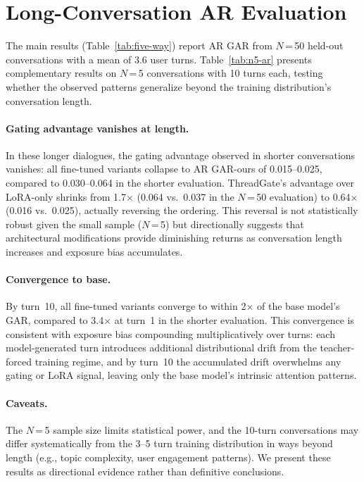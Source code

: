 \section{Long-Conversation AR Evaluation}\label{sec:appendix-n5}

The main results (Table~\ref{tab:five-way}) report AR GAR from $N$\,=\,50 held-out conversations with a mean of 3.6 user turns. Table~\ref{tab:n5-ar} presents complementary results on $N$\,=\,5 conversations with 10 turns each, testing whether the observed patterns generalize beyond the training distribution's conversation length.

\paragraph{Gating advantage vanishes at length.} In these longer dialogues, the gating advantage observed in shorter conversations vanishes: all fine-tuned variants collapse to AR GAR-ours of 0.015--0.025, compared to 0.030--0.064 in the shorter evaluation. ThreadGate's advantage over LoRA-only shrinks from 1.7$\times$ (0.064 vs.\ 0.037 in the $N$\,=\,50 evaluation) to 0.64$\times$ (0.016 vs.\ 0.025), actually reversing the ordering. This reversal is not statistically robust given the small sample ($N$\,=\,5) but directionally suggests that architectural modifications provide diminishing returns as conversation length increases and exposure bias accumulates.

\paragraph{Convergence to base.} By turn~10, all fine-tuned variants converge to within 2$\times$ of the base model's GAR, compared to 3.4$\times$ at turn~1 in the shorter evaluation. This convergence is consistent with exposure bias compounding multiplicatively over turns: each model-generated turn introduces additional distributional drift from the teacher-forced training regime, and by turn~10 the accumulated drift overwhelms any gating or LoRA signal, leaving only the base model's intrinsic attention patterns.

\paragraph{Caveats.} The $N$\,=\,5 sample size limits statistical power, and the 10-turn conversations may differ systematically from the 3--5 turn training distribution in ways beyond length (e.g., topic complexity, user engagement patterns). We present these results as directional evidence rather than definitive conclusions.

